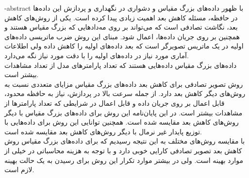 
\fa-abstract{
با ظهور داده‌های بزرگ مقیاس و دشواری در نگهداری و پردازش این داده‌ها در حافظه، مسئله کاهش بعد اهمیت زیادی پیدا کرده است. یکی از روش‌های کاهش بعد، نگاشت تصادفی است که می‌تواند بر روی مه‌داد‌هایی که بزرگ مقیاس هستند و همچنین بر روی جریان‌ داده‌ها، اعمال شود. مبنای این روش ضرب ماتریسی داده‌های اولیه در یک ماتریس تصویرگر است که بعد داده‌های اولیه را کاهش داده ولی اطلاعات آماری مورد نیاز در داده‌های اولیه را با دقت مورد نیاز نگه می‌دارد.\\
داده‌های بزرگ مقیاس داده‌هایی هستند که تعداد پارامترهای مدل از تعداد مشاهدات بیشتر است.\\
روش تصویر تصادفی برای کاهش بعد داده‌های بزرگ مقیاس مزایای متعددی نسبت به روش‌های دیگر کاهش بعد دارد. از جمله سرعت بالا در پردازش، نیاز به حافظه محدود، قابل اعمال بر روی جریان داده و قابل اعمال در شرایطی که تعداد پارامتر‌ها از مشاهدات بیشتر است. در این پایان‌نامه این روش برای داده‌های بزرگ مقیاس با دیگر روش‌های کاهش بعد مقایسه شده است. همچنین توانایی این روش برای داده‌هایی با توزیع پایدار غیر نرمال با دیگر روش‌های کاهش بعد مقایسه شده است.\\
با مقایسه روش‌های مختلف به این نتیجه رسیدیم که برای داده‌های بزرگ مقیاس روش کاهش بعد تصویر تصادفی کارایی خوبی دارد و با توجه به هزینه محاسباتی در خیلی از موارد بهینه است. ولی در بیشتر موارد تکرار این روش برای رسیدن به یک حالت بهینه لازم است.\\
}





\AUTtitle
